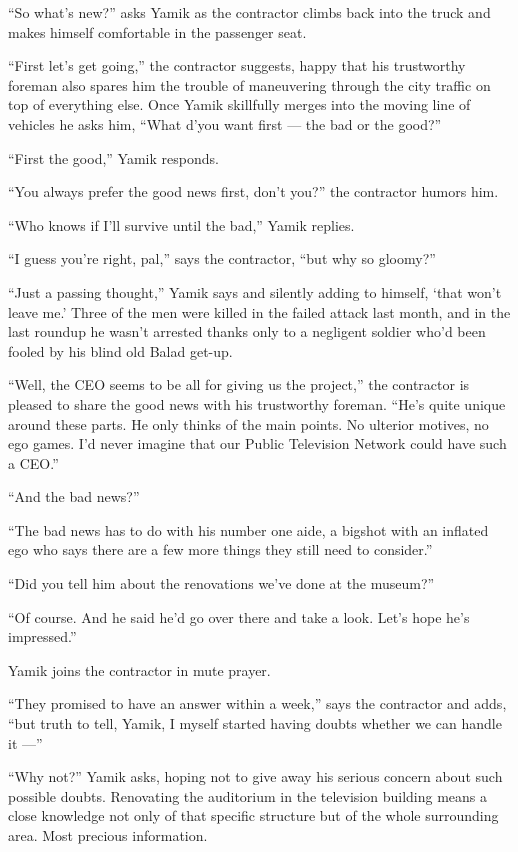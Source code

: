 \documentclass[twoside,11pt,openany]{book}
\begin{document}
``So what's new?'' asks Yamik as the contractor climbs back into the truck and makes himself
comfortable in the passenger seat.

``First let's get going,'' the contractor suggests, happy that his trustworthy foreman also
spares him the trouble of maneuvering through the city traffic on top of everything else. Once Yamik skillfully merges
into the moving line of vehicles he asks him, ``What d'you want first --- the bad or the
good?''

``First the good,'' Yamik responds.

``You always prefer the good news first, don't you?'' the contractor humors him.

``Who knows if I'll survive until the bad,'' Yamik replies.{ }

``I guess you're right, pal,'' says the contractor, ``but why so
gloomy?''

``Just a passing thought,'' Yamik says and silently adding to himself, `that won't leave me.'
Three of the men were killed in the failed attack last month, and in the last roundup he wasn't arrested thanks only to
a negligent soldier who'd been fooled by his blind old Balad get-up.

``Well, the CEO seems to be all for giving us the project,'' the contractor is pleased to
share the good news with his trustworthy foreman. ``He's quite unique around these parts. He only thinks
of the main points. No ulterior motives, no ego games. I'd never imagine that our Public Television Network could have
such a CEO.''

``And the bad news?''

``The bad news has to do with his number one aide, a bigshot with an inflated ego who says there are a few
more things they still need to consider.''

``Did you tell him about the renovations we've done at the museum?''

``Of course. And he said he'd go over there and take a look. Let's hope he's impressed.''

Yamik joins the contractor in mute prayer.

``They promised to have an answer within a week,'' says the contractor and adds,
``but truth to tell, Yamik, I myself started having doubts whether we can handle it ---''

``Why not?'' Yamik asks, hoping not to give away his serious{ }concern about
such possible doubts. Renovating the auditorium in the television building means a close knowledge not only of that
specific structure but of the whole surrounding area. Most precious information.
\end{document}
